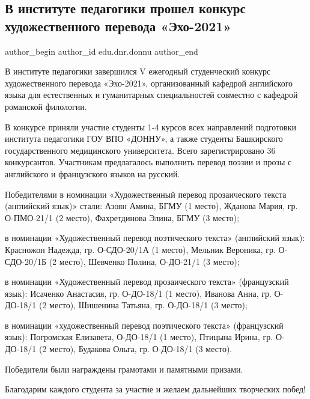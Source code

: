  
 
 
 
 
\subsection{В институте педагогики прошел конкурс художественного перевода «Эхо-2021»}
\label{sec:30_12_2021.stz.edu.dnr.donnu.1.institut_pedagogiki}

\ifcmt
 author_begin
   author_id edu.dnr.donnu
 author_end
\fi

В институте педагогики завершился V ежегодный студенческий конкурс
художественного перевода «Эхо-2021», организованный кафедрой английского языка
для естественных и гуманитарных специальностей совместно с кафедрой романской
филологии.


В конкурсе приняли участие студенты 1-4 курсов всех направлений подготовки
института педагогики ГОУ ВПО «ДОННУ», а также студенты Башкирского
государственного медицинского университета. Всего зарегистрировано 36
конкурсантов. Участникам предлагалось выполнить перевод поэзии и прозы с
английского и французского языков на русский.

Победителями в номинации «Художественный перевод прозаического текста
(английский язык)» стали: Азоян Амина, БГМУ (1 место), Жданова Мария, гр.
О-ПМО-21/1 (2 место), Фахретдинова Элина, БГМУ (3 место); 

в номинации «Художественный перевод поэтического текста» (английский язык):
Красножон Надежда, гр. О-СДО-20/1А (1 место), Мельник Вероника, гр. О-СДО-20/1Б
(2 место), Шевченко Полина, О-ДО-21/1 (3 место); 

в номинации «Художественный перевод прозаического текста» (французский язык):
Исаченко Анастасия, гр.  О-ДО-18/1 (1 место), Иванова Анна, гр. О-ДО-18/1 (2
место), Шишенина Татьяна, гр. О-ДО-18/1 (3 место); 

в номинации «художественный перевод поэтического текста» (французский язык):
Погромская Елизавета, О-ДО-18/1 (1 место), Птицына Ирина, гр. О-ДО-18/1 (2
место), Будакова Ольга, гр. О-ДО-18/1 (3 место).

Победители были награждены грамотами и памятными призами.

Благодарим каждого студента за участие и желаем дальнейших творческих побед!
